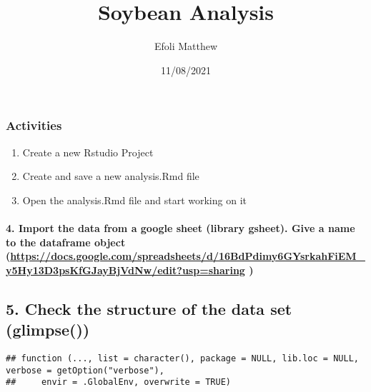 \documentclass[
]{article}
\title{Soybean Analysis}
\author{Efoli Matthew}
\date{11/08/2021}
\providecommand{\tightlist}{%
  \setlength{\itemsep}{0pt}\setlength{\parskip}{0pt}}
\begin{document}
\maketitle

\hypertarget{activities}{%
\subsubsection{Activities}\label{activities}}

\begin{enumerate}
\def\labelenumi{\arabic{enumi}.}
\tightlist
\item
  Create a new Rstudio Project
\item
  Create and save a new analysis.Rmd file
\item
  Open the analysis.Rmd file and start working on it
\end{enumerate}

\hypertarget{import-the-data-from-a-google-sheet-library-gsheet.-give-a-name-to-the-dataframe-object-httpsdocs.google.comspreadsheetsd16bdpdimy6gysrkahfiem_y5hy13d3pskfgjaybjvdnwedituspsharing}{%
\paragraph{\texorpdfstring{4. Import the data from a google sheet
(library gsheet). Give a name to the dataframe object
(\url{https://docs.google.com/spreadsheets/d/16BdPdimy6GYsrkahFiEM_y5Hy13D3psKfGJayBjVdNw/edit?usp=sharing}
)}{4. Import the data from a google sheet (library gsheet). Give a name to the dataframe object (https://docs.google.com/spreadsheets/d/16BdPdimy6GYsrkahFiEM\_y5Hy13D3psKfGJayBjVdNw/edit?usp=sharing )}}\label{import-the-data-from-a-google-sheet-library-gsheet.-give-a-name-to-the-dataframe-object-httpsdocs.google.comspreadsheetsd16bdpdimy6gysrkahfiem_y5hy13d3pskfgjaybjvdnwedituspsharing}}

\hypertarget{check-the-structure-of-the-data-set-glimpse}{%
\subsection{5. Check the structure of the data set
(glimpse())}\label{check-the-structure-of-the-data-set-glimpse}}

\begin{verbatim}
## function (..., list = character(), package = NULL, lib.loc = NULL, verbose = getOption("verbose"), 
##     envir = .GlobalEnv, overwrite = TRUE)
\end{verbatim}
\end{document}
